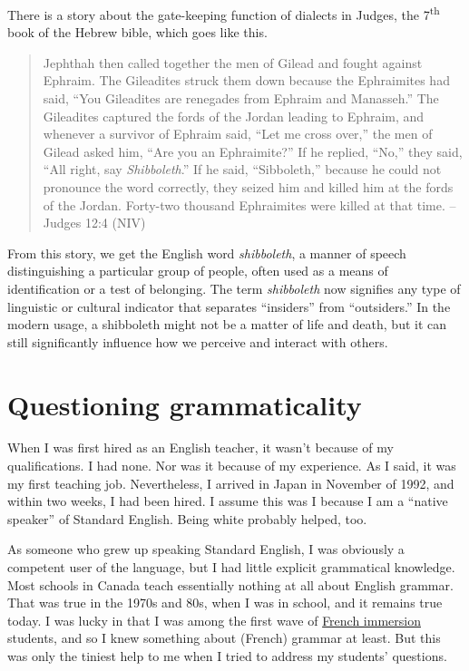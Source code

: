 \begin{tcolorbox}[title=What's a shibboleth\is{shibboleth|(}?, colback=white] \label{sec:shibboleth}
    There is a story about the gate-keeping function of dialects in Judges, the 7\textsuperscript{th}
    book of the Hebrew bible, which goes like this.
    
    \begin{quote}
        Jephthah then called together the men of Gilead and fought against Ephraim. The Gileadites struck them down because the Ephraimites had said, ``You Gileadites are renegades from Ephraim and Manasseh.'' The Gileadites captured the fords of the Jordan leading to Ephraim, and whenever a survivor of Ephraim said, ``Let me cross over,'' the men of Gilead asked him, ``Are you an Ephraimite?'' If he replied, ``No,'' they said, ``All right, say \textit{Shibboleth}.'' If he said, ``Sibboleth,'' because he could not pronounce the word correctly, they seized him and killed him at the fords of the Jordan. Forty-two thousand Ephraimites were killed at that time. --Judges 12:4 (NIV)
    \end{quote}
    
    From this story, we get the English word \textit{shibboleth}, a manner of speech distinguishing a particular group of people, often used as a means of identification or a test of belonging. The term \textit{shibboleth} now signifies any type of linguistic or cultural indicator that separates ``insiders'' from ``outsiders.'' In the modern usage, a shibboleth might not be a matter of life and death, but it can still significantly influence how we perceive and interact with others.
    
\end{tcolorbox}

\section{Questioning grammaticality} \label{sec:questioning-grammaticality}

When I was first hired as an English teacher, it wasn't because of my qualifications. I had none. Nor was it because of my experience. As I said, it was my first teaching job. Nevertheless, I arrived in Japan in November of 1992, and within two weeks, I had been hired. I assume this was I because I am a ``native speaker'' of Standard English. Being white probably helped, too.

As someone who grew up speaking Standard English, I was obviously a competent user of the language, but I had little explicit grammatical knowledge. Most schools in Canada teach essentially nothing at all about English grammar. That was true in the 1970s and 80s, when I was in school, and it remains true today. I was lucky in that I was among the first wave of \href{https://en.wikipedia.org/wiki/French_immersion#Canada}{French immersion} students, and so I knew something about (French) grammar at least. But this was only the tiniest help to me when I tried to address my students' questions.

